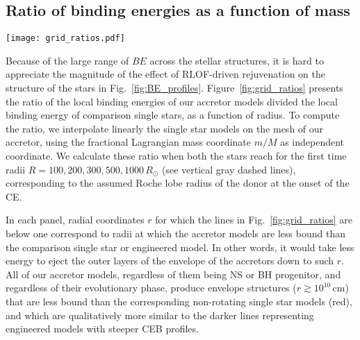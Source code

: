 \documentclass[twocolumn,twocolappendix,trackchanges]{aastex63}
\DeclareRobustCommand{\Figref}[1]{Fig.~\ref{#1}}
\begin{document}
\subsection{Ratio of binding energies as a function of mass}

\begin{figure*}[htbp]
  \texttt{[image: grid\_ratios.pdf]}
  \caption{Ratios of the binding energy profiles (including internal
    energy) of the accretor stars divided stars of the same total mass
    post-RLOF. The red solid lines show the ratio to a non-rotating
    single star, while the other colors show the ratio to
    ``engineered'' star (see text). Each panel shows the ratios at the
    first time the models reach the radius indicated on the right and
    by the vertical dashed gray line.}
  \label{fig:grid_ratios}
\end{figure*}

Because of the large range of $BE$ across the stellar structures, it
is hard to appreciate the magnitude of the effect of RLOF-driven
rejuvenation on the structure of the stars in
\Figref{fig:BE_profiles}. Figure~\ref{fig:grid_ratios} presents the
ratio of the local binding energies of our accretor models divided the
local binding energy of comparison single stars, as a function of
radius. To compute the ratio, we interpolate linearly the single star
models on the mesh of our accretor, using the fractional Lagrangian
mass coordinate $m/M$ as independent coordinate. %
We calculate these ratio
when both the stars reach for the first time radii
$R=100, 200, 300, 500, 1000\,R_\odot$ (see vertical gray dashed
lines), corresponding to the assumed Roche lobe radius of the donor at
the onset of the CE.

In each panel, radial coordinates $r$ for which the lines in
\Figref{fig:grid_ratios} are below one correspond to radii at which
the accretor models are less bound than the comparison single
star or engineered model. In other words, it would take less energy to
eject the outer layers of the envelope of the accretors down to such
$r$. All of our accretor models, regardless of them being NS or BH
progenitor, and regardless of their evolutionary phase, produce
envelope structures ($r\gtrsim 10^{10}\,\mathrm{cm}$) that are less
bound than the corresponding non-rotating single star models (red),
and which are qualitatively more similar to the darker lines
representing engineered models with steeper CEB profiles.
\end{document}
